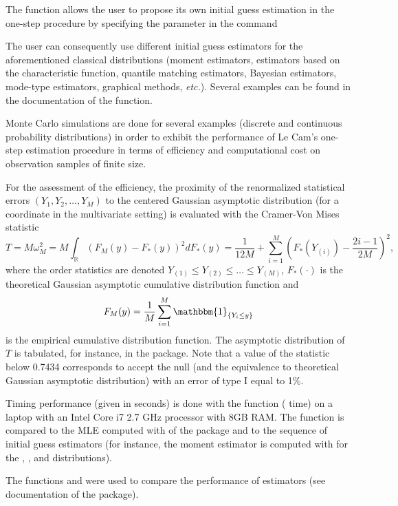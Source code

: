 The function  allows the user to propose its own initial guess estimation in the one-step procedure by specifying the parameter  in the command


The user can consequently use different initial guess estimators for the aforementioned classical distributions (moment estimators, estimators based on the characteristic function, quantile matching estimators, Bayesian estimators, mode-type estimators, graphical methods, {\it etc.}). Several examples can be found in the documentation of the  function.

Monte Carlo simulations are done for several examples (discrete and continuous probability distributions) in order to exhibit the performance of Le Cam's one-step estimation procedure in terms of efficiency and computational cost on observation samples of finite size. 

For the assessment of the efficiency, the proximity of the renormalized statistical errors $(Y_1,Y_2,\ldots, Y_M)$ to the centered Gaussian asymptotic distribution (for a coordinate in the multivariate setting) is evaluated with the Cramer-Von Mises statistic 
$$ T= M \omega^2_M = M \int_\mathbb{R} \left(F_M(y)-F_*(y) \right)^2 dF_*(y) = \frac{1}{12M} + \sum_{i=1}^M  \left(F_*(Y_{(i)})- \frac{2i-1}{2M}\right)^2,$$
where the order statistics are denoted $Y_{(1)} \leq Y_{(2)} \leq \dots \leq  Y_{(M)}$, $F_*(\cdot)$ is the theoretical Gaussian asymptotic cumulative distribution function and 
$$F_M(y)=\frac{1}{M}\sum_{i=1}^M \mathbbm{1}_{\{ Y_i \leq y \}}$$
is the empirical cumulative distribution function. The asymptotic distribution of $T$ is tabulated, for instance, in the  package. Note that a value of the statistic below 0.7434 corresponds to accept the null (and the equivalence to theoretical Gaussian asymptotic distribution) with an error of type I equal to 1\%. 

Timing performance (given in seconds) is done with the   function ( time) on a laptop with an Intel Core i7 2.7 GHz processor with 8GB RAM. The  function is compared to the MLE computed with  of the  package and to the sequence of initial guess estimators (for instance, the moment estimator is computed with  for the , , and  distributions).

The functions  and   were used  to compare the performance of estimators (see documentation of the  package).

